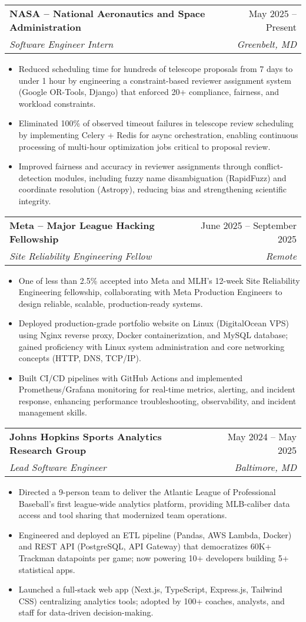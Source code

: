 \documentclass[letterpaper,10pt]{article}
\makeatletter
\newcommand{\resumeItem}[1]{
  \item\small{
    {#1 \vspace{-2pt}}
  }
}
\newcommand{\resumeSubheading}[4]{
  \vspace{-2pt}\item
    \begin{tabular*}{0.97\textwidth}[t]{l@{\extracolsep{\fill}}r}
      \textbf{#1} & #2 \\
      \textit{\small#3} & \textit{\small #4} \\
    \end{tabular*}\vspace{-7pt}
}
\newcommand{\resumeItemListStart}{\begin{itemize}}
\newcommand{\resumeItemListEnd}{\end{itemize}\vspace{-5pt}}
\makeatother
\begin{document}
    \resumeSubheading
      {NASA – National Aeronautics and Space Administration}{May 2025 -- Present}
      {Software Engineer Intern}{Greenbelt, MD}
      \resumeItemListStart
        \resumeItem{Reduced scheduling time for hundreds of telescope proposals from 7 days to under 1 hour by engineering a constraint-based reviewer assignment system (Google OR-Tools, Django) that enforced 20+ compliance, fairness, and workload constraints.}
        \resumeItem{Eliminated 100\% of observed timeout failures in telescope review scheduling by implementing Celery + Redis for async orchestration, enabling continuous processing of multi-hour optimization jobs critical to proposal review.}
        \resumeItem{Improved fairness and accuracy in reviewer assignments through conflict-detection modules, including fuzzy name disambiguation (RapidFuzz) and coordinate resolution (Astropy), reducing bias and strengthening scientific integrity.}

      \resumeItemListEnd

\resumeSubheading
    {Meta – Major League Hacking Fellowship}{June 2025 -- September 2025}
    {Site Reliability Engineering Fellow}{Remote}
    \resumeItemListStart
    \resumeItem{One of less than 2.5\% accepted into Meta and MLH's 12-week Site Reliability Engineering fellowship, collaborating with Meta Production Engineers to design reliable, scalable, production-ready systems.}
    \resumeItem{Deployed production-grade portfolio website on Linux (DigitalOcean VPS) using Nginx reverse proxy, Docker containerization, and MySQL database; gained proficiency with Linux system administration and core networking concepts (HTTP, DNS, TCP/IP).}
    \resumeItem{Built CI/CD pipelines with GitHub Actions and implemented Prometheus/Grafana monitoring for real-time metrics, alerting, and incident response, enhancing performance troubleshooting, observability, and incident management skills.}

    \resumeItemListEnd

    \resumeSubheading
      {Johns Hopkins Sports Analytics Research Group}{May 2024 -- May 2025}
      {Lead Software Engineer}{Baltimore, MD}
      \resumeItemListStart
        \resumeItem{Directed a 9-person team to deliver the Atlantic League of Professional Baseball’s first league-wide analytics platform, providing MLB-caliber data access and tool sharing that modernized team operations.}
        \resumeItem{Engineered and deployed an ETL pipeline (Pandas, AWS Lambda, Docker) and REST API (PostgreSQL, API Gateway) that democratizes 60K+ Trackman datapoints per game; now powering 10+ developers building 5+ statistical apps.}
        \resumeItem{Launched a full-stack web app (Next.js, TypeScript, Express.js, Tailwind CSS) centralizing analytics tools; adopted by 100+ coaches, analysts, and staff for data-driven decision-making.}
      \resumeItemListEnd
    
\end{document}
